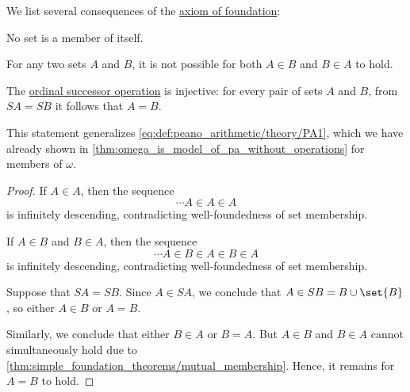 \begin{corollary}\label{thm:simple_foundation_theorems}
  We list several consequences of the \hyperref[def:zfc/foundation]{axiom of foundation}:

  \begin{thmenum}
     No set is a member of itself.

     For any two sets \( A \) and \( B \), it is not possible for both \( A \in B \) and \( B \in A \) to hold.

     The \hyperref[def:ordinal_successor]{ordinal successor operation} is injective: for every pair of sets \( A \) and \( B \), from \( SA = SB \) it follows that \( A = B \).

    This statement generalizes \eqref{eq:def:peano_arithmetic/theory/PA1}, which we have already shown in \cref{thm:omega_is_model_of_pa_without_operations} for members of \( \omega \).
  \end{thmenum}
\end{corollary}
\begin{proof}
   If \( A \in A \), then the sequence
  \begin{equation*}
    \cdots A \in A \in A
  \end{equation*}
  is infinitely descending, contradicting well-foundedness of set membership.

   If \( A \in B \) and \( B \in A \), then the sequence
  \begin{equation*}
    \cdots A \in B \in A \in B \in A
  \end{equation*}
  is infinitely descending, contradicting well-foundedness of set membership.

   Suppose that \( SA = SB \). Since \( A \in SA \), we conclude that \( A \in SB = B \cup \set{ B } \), so either \( A \in B \) or \( A = B \).

  Similarly, we conclude that either \( B \in A \) or \( B = A \). But \( A \in B \) and \( B \in A \) cannot simultaneously hold due to \cref{thm:simple_foundation_theorems/mutual_membership}. Hence, it remains for \( A = B \) to hold.
\end{proof}

